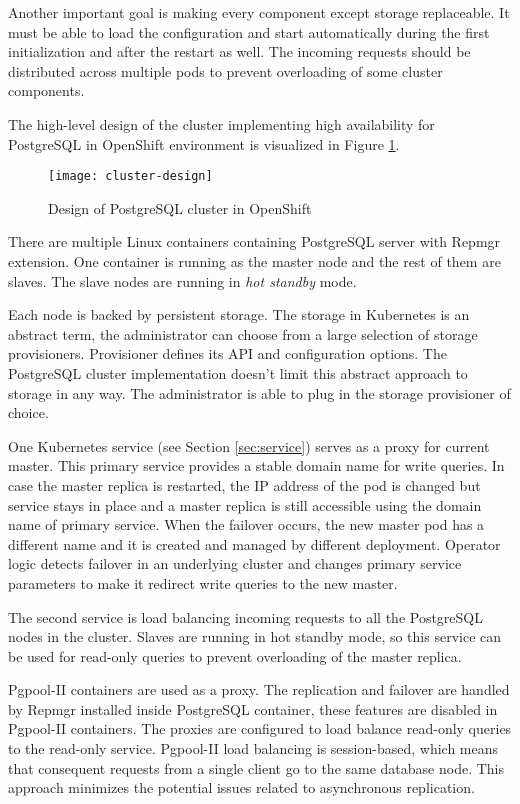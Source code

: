 \documentclass[
  digital, %
  twoside, %
  table,   %
  lof,     %
  lot,     %
]{fithesis3}
\begin{document}
Another important goal is making every component except storage replaceable. It must be able to load the configuration and start automatically during the first initialization and after the restart as well. The incoming requests should be distributed across multiple pods to prevent overloading of some cluster components.

The high-level design of the cluster implementing high availability for PostgreSQL in OpenShift environment is visualized in Figure \ref{fig:cluster_design}.

\begin{figure}[H]
\caption{Design of PostgreSQL cluster in OpenShift}
\centering
\texttt{[image: cluster-design]}
\label{fig:cluster_design}
\end{figure}

There are multiple Linux containers containing PostgreSQL server with Repmgr extension. One container is running as the master node and the rest of them are slaves. The slave nodes are running in \textit{hot standby} mode.

Each node is backed by persistent storage. The storage in Kubernetes is an abstract term, the administrator can choose from a large selection of storage provisioners. Provisioner defines its API and configuration options.  The PostgreSQL cluster implementation doesn't limit this abstract approach to storage in any way. The administrator is able to plug in the storage provisioner of choice.

One Kubernetes service (see Section \ref{sec:service}) serves as a proxy for current master. This primary service provides a stable domain name for write queries. In case the master replica is restarted, the IP address of the pod is changed but service stays in place and a master replica is still accessible using the domain name of primary service. When the failover occurs, the new master pod has a different name and it is created and managed by different deployment. Operator logic detects failover in an underlying cluster and changes primary service parameters to make it redirect write queries to the new master.

The second service is load balancing incoming requests to all the PostgreSQL nodes in the cluster. Slaves are running in hot standby mode, so this service can be used for read-only queries to prevent overloading of the master replica.

Pgpool-II containers are used as a proxy. The replication and failover are handled by Repmgr installed inside PostgreSQL container, these features are disabled in Pgpool-II containers. The proxies are configured to load balance read-only queries to the read-only service. Pgpool-II load balancing is session-based, which means that consequent requests from a single client go to the same database node. This approach minimizes the potential issues related to asynchronous replication.
\end{document}
